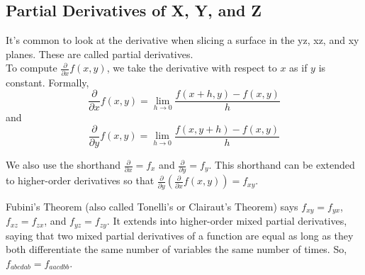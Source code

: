 \subsection{Partial Derivatives of X, Y, and Z}
\noindent
It's common to look at the derivative when slicing a surface in the yz, xz, and xy planes. These are called partial derivatives.\\

\noindent
To compute $\frac{\partial}{\partial x}{f(x,y)}$, we take the derivative with respect to $x$ as if $y$ is constant. Formally,
\begin{equation*}
	\frac{\partial}{\partial x}f(x,y) = \lim_{h \to 0}{\frac{f(x+h,y)-f(x,y)}{h}}
\end{equation*} 
and 
\begin{equation*}
	\frac{\partial}{\partial y}f(x,y) = \lim_{h \to 0}{\frac{f(x,y+h)-f(x,y)}{h}}
\end{equation*}

\noindent
We also use the shorthand $\frac{\partial}{\partial x}=f_x$ and $\frac{\partial}{\partial y}=f_y$. This shorthand can be extended to higher-order derivatives so that $\frac{\partial}{\partial y}\left(\frac{\partial}{\partial x}f(x,y)\right)=f_{xy}$.

\noindent
Fubini's Theorem (also called Tonelli's or Clairaut's Theorem) says $f_{xy} = f_{yx}$, $f_{xz} = f_{zx}$, and $f_{yz} = f_{zy}$. It extends into higher-order mixed partial derivatives, saying that two mixed partial derivatives of a function are equal as long as they both differentiate the same number of variables the same number of times. So, $f_{abcdab} = f_{aacdbb}$.